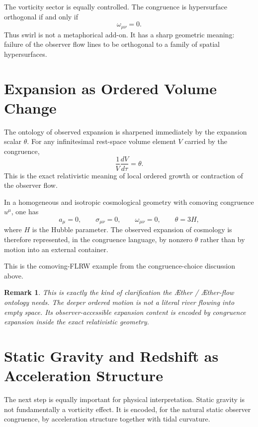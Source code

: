 \documentclass[11pt]{article}
\newcommand{\Aether}{\AE{}ther}
\newcommand{\Aflow}{\AE{}ther-flow}
\newtheorem{remark}{Remark}
\begin{document}
The vorticity sector is equally controlled. The congruence is hypersurface orthogonal if and only if
\begin{equation}
\omega_{\mu\nu}=0.
\label{eq:frobenius}
\end{equation}
Thus swirl is not a metaphorical add-on. It has a sharp geometric meaning: failure of the observer flow lines to be orthogonal to a family of spatial hypersurfaces.

\section{Expansion as Ordered Volume Change}

The ontology of observed expansion is sharpened immediately by the expansion scalar \(\theta\). For any infinitesimal rest-space volume element \(V\) carried by the congruence,
\begin{equation}
\frac{1}{V}\frac{dV}{d\tau}=\theta.
\label{eq:volumeexpansion}
\end{equation}
This is the exact relativistic meaning of local ordered growth or contraction of the observer flow.

In a homogeneous and isotropic cosmological geometry with comoving congruence \(u^\mu\), one has
\begin{equation}
a_\mu=0,
\qquad
\sigma_{\mu\nu}=0,
\qquad
\omega_{\mu\nu}=0,
\qquad
\theta = 3H,
\label{eq:flrwtheta}
\end{equation}
where \(H\) is the Hubble parameter. The observed expansion of cosmology is therefore represented, in the congruence language, by nonzero \(\theta\) rather than by motion into an external container.

This is the comoving-FLRW example from the congruence-choice discussion above.

\begin{remark}
This is exactly the kind of clarification the \Aether{} / \Aflow{} ontology needs. The deeper ordered motion is not a literal river flowing into empty space. Its observer-accessible expansion content is encoded by congruence expansion inside the exact relativistic geometry.
\end{remark}

\section{Static Gravity and Redshift as Acceleration Structure}

The next step is equally important for physical interpretation. Static gravity is not fundamentally a vorticity effect. It is encoded, for the natural static observer congruence, by acceleration structure together with tidal curvature.
\end{document}
